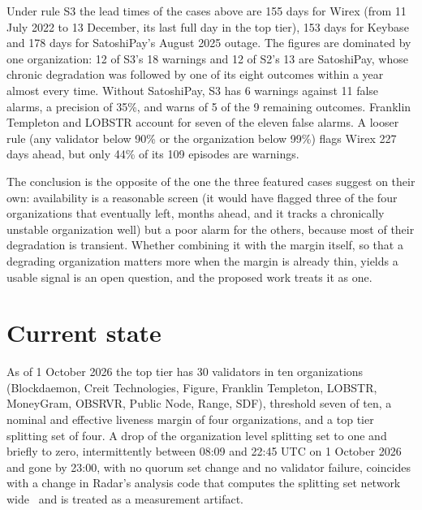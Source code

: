 \documentclass[11pt,a4paper]{article}
\begin{document}
Under rule S3 the lead times of the cases above are 155 days for Wirex (from 11 July 2022 to 13 December, its last full day in the top tier), 153 days for Keybase and 178 days for SatoshiPay's August 2025 outage. The figures are dominated by one organization: 12 of S3's 18 warnings and 12 of S2's 13 are SatoshiPay, whose chronic degradation was followed by one of its eight outcomes within a year almost every time. Without SatoshiPay, S3 has 6 warnings against 11 false alarms, a precision of 35\%, and warns of 5 of the 9 remaining outcomes. Franklin Templeton and LOBSTR account for seven of the eleven false alarms. A looser rule (any validator below 90\% or the organization below 99\%) flags Wirex 227 days ahead, but only 44\% of its 109 episodes are warnings.

The conclusion is the opposite of the one the three featured cases suggest on their own: availability is a reasonable screen (it would have flagged three of the four organizations that eventually left, months ahead, and it tracks a chronically unstable organization well) but a poor alarm for the others, because most of their degradation is transient. Whether combining it with the margin itself, so that a degrading organization matters more when the margin is already thin, yields a usable signal is an open question, and the proposed work treats it as one.

\section{Current state}
As of 1 October 2026 the top tier has 30 validators in ten organizations (Blockdaemon, Creit Technologies, Figure, Franklin Templeton, LOBSTR, MoneyGram, OBSRVR, Public Node, Range, SDF), threshold seven of ten, a nominal and effective liveness margin of four organizations, and a top tier splitting set of four. A drop of the organization level splitting set to one and briefly to zero, intermittently between 08:09 and 22:45 UTC on 1 October 2026 and gone by 23:00, with no quorum set change and no validator failure, coincides with a change in Radar's analysis code that computes the splitting set network wide~\cite{radarcommit} and is treated as a measurement artifact.
\end{document}
